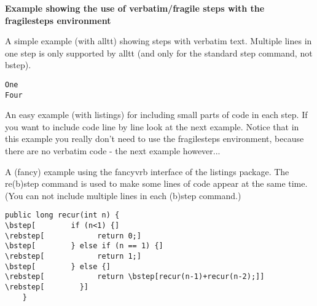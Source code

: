 \documentclass[12pt,a4paper]{article}
\def\listcodefromfile#1#2#3{%
}
\begin{document}
\begin{center}
{\textbf{Example showing the use of verbatim/fragile steps with the fragilesteps environment}}
\end{center}

A simple example (with alltt) showing steps with verbatim text.
Multiple lines in one step is only supported by alltt (and only for the
standard step command, not bstep).
\pause
\begin{fragilesteps}
\begin{alltt}
    One
    Four
\end{alltt}
\end{fragilesteps}

\pause

An easy example (with listings) for including small parts of code in each step.
If you want to include code line by line look at the next example. Notice that in this
example you really don't need to use the fragilesteps environment, because
there are no verbatim code - the next example however...
\lstset{language=Java}
\begin{fragilesteps}
\step{\listcodefromfile{1}{3}{dummy.java}}
\step{\listcodefromfile{4}{7}{dummy.java}}
\end{fragilesteps}

\pause

A (fancy) example using the fancyvrb interface of the listings package.
The re(b)step command is used to make some lines of code appear at the same time.
(You can not include multiple lines in each (b)step command.)
\pause
\lstset{fancyvrb=true}
\begin{fragilesteps}
\begin{Verbatim}[fontfamily=cmr]
    public long recur(int n) {
\bstep[        if (n<1) {]
\rebstep[            return 0;]
\bstep[        } else if (n == 1) {]
\rebstep[            return 1;]
\bstep[        } else {]
\rebstep[            return \bstep[recur(n-1)+recur(n-2);]]
\rebstep[        }]
    }
\end{Verbatim}
\end{fragilesteps}
\end{document}
